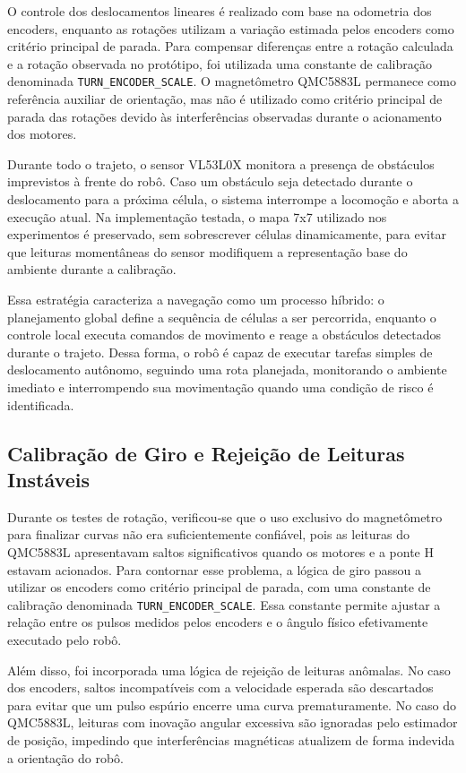 \documentclass[	12pt, Times, openright, twoside, a4paper, english, brazil]{abntex2}
\begin{document}
O controle dos deslocamentos lineares é realizado com base na odometria dos encoders, enquanto as rotações utilizam a variação estimada pelos encoders como critério principal de parada. Para compensar diferenças entre a rotação calculada e a rotação observada no protótipo, foi utilizada uma constante de calibração denominada \texttt{TURN\_ENCODER\_SCALE}. O magnetômetro QMC5883L permanece como referência auxiliar de orientação, mas não é utilizado como critério principal de parada das rotações devido às interferências observadas durante o acionamento dos motores.

Durante todo o trajeto, o sensor VL53L0X monitora a presença de obstáculos imprevistos à frente do robô. Caso um obstáculo seja detectado durante o deslocamento para a próxima célula, o sistema interrompe a locomoção e aborta a execução atual. Na implementação testada, o mapa 7x7 utilizado nos experimentos é preservado, sem sobrescrever células dinamicamente, para evitar que leituras momentâneas do sensor modifiquem a representação base do ambiente durante a calibração.

Essa estratégia caracteriza a navegação como um processo híbrido: o planejamento global define a sequência de células a ser percorrida, enquanto o controle local executa comandos de movimento e reage a obstáculos detectados durante o trajeto. Dessa forma, o robô é capaz de executar tarefas simples de deslocamento autônomo, seguindo uma rota planejada, monitorando o ambiente imediato e interrompendo sua movimentação quando uma condição de risco é identificada.

\subsection{Calibração de Giro e Rejeição de Leituras Instáveis}

Durante os testes de rotação, verificou-se que o uso exclusivo do magnetômetro para finalizar curvas não era suficientemente confiável, pois as leituras do QMC5883L apresentavam saltos significativos quando os motores e a ponte H estavam acionados. Para contornar esse problema, a lógica de giro passou a utilizar os encoders como critério principal de parada, com uma constante de calibração denominada \texttt{TURN\_ENCODER\_SCALE}. Essa constante permite ajustar a relação entre os pulsos medidos pelos encoders e o ângulo físico efetivamente executado pelo robô.

Além disso, foi incorporada uma lógica de rejeição de leituras anômalas. No caso dos encoders, saltos incompatíveis com a velocidade esperada são descartados para evitar que um pulso espúrio encerre uma curva prematuramente. No caso do QMC5883L, leituras com inovação angular excessiva são ignoradas pelo estimador de posição, impedindo que interferências magnéticas atualizem de forma indevida a orientação do robô.
\end{document}
